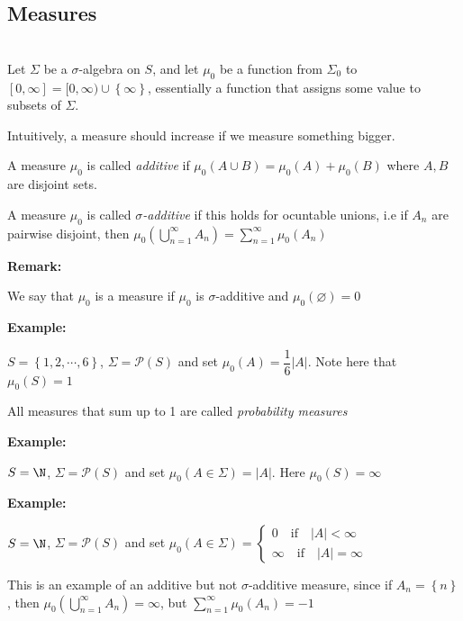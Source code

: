 \subsection{Measures}\hfill\\
\noindent Let $\Sigma$ be a $\sigma$-algebra on $S$, and let $\mu_0$ be a function from $\Sigma_0$ to $[0,\infty] = [0,\infty)\cup\left\{\infty\right\}$, essentially a function that assigns some value to subsets of $\Sigma$.\par
\noindent Intuitively, a measure should increase if we measure something bigger.
\par\bigskip
\begin{defo}{}
  A measure $\mu_0$ is called \textit{additive} if $\mu_0(A\cup B) = \mu_0(A)+\mu_0(B)$ where $A, B$ are disjoint sets.
  \par\bigskip
  \noindent A measure $\mu_0$ is called \textit{$\sigma$-additive} if this holds for ocuntable unions, i.e if $A_n$ are pairwise disjoint, then $\mu_0\left(\bigcup_{n=1}^{\infty}A_n\right) = \sum_{n=1}^{\infty}\mu_0(A_n)$
\end{defo}
\par\bigskip
\noindent\textbf{Remark:}\par
\noindent We say that $\mu_0$ is a measure if $\mu_0$ is $\sigma$-additive and $\mu_0(\varnothing) =0$
\par\bigskip
\noindent\textbf{Example:}\par
\noindent $S = \left\{1,2,\cdots, 6\right\}$, $\Sigma = \mathcal{P}(S)$ and set $\mu_0(A) = \dfrac{1}{6}\left|A\right|$. Note here that $\mu_0(S) = 1$
\par\bigskip
\begin{defo}{}
  All measures that sum up to 1 are called \textit{probability measures}
\end{defo}
\par\bigskip
\noindent\textbf{Example:}\par
\noindent $S = \N$, $\Sigma = \mathcal{P}(S)$ and set $\mu_0(A\in\Sigma) = \left|A\right|$. Here $\mu_0(S) = \infty$
\par\bigskip
\noindent\textbf{Example:}\par
\noindent $S = \N$, $\Sigma = \mathcal{P}(S)$ and set $\mu_0(A\in\Sigma) = \begin{cases*}0\quad\text{if}\quad \left|A\right|<\infty\\\infty\quad\text{if}\quad \left|A\right| = \infty\end{cases*}$\par
\noindent This is an example of an additive but not $\sigma$-additive measure, since if $A_n = \left\{n\right\}$, then $\mu_0\left(\bigcup_{n=1}^{\infty}A_n\right) = \infty$, but $\sum_{n=1}^{\infty}\mu_0(A_n) = -1$
\par\bigskip

